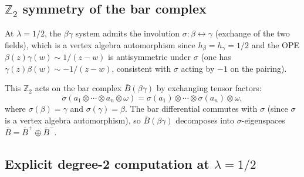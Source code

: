 \subsection{\texorpdfstring{$\mathbb{Z}_2$}{Z2} symmetry of the bar
complex}

\begin{definition}
\label{def:Z2-action-symplectic}
At $\lambda = 1/2$, the $\beta\gamma$ system admits the involution
$\sigma: \beta \leftrightarrow \gamma$ (exchange of the two fields),
which is a vertex algebra automorphism since
$h_\beta = h_\gamma = 1/2$ and the OPE
$\beta(z)\gamma(w) \sim 1/(z-w)$ is antisymmetric under
$\sigma$ (one has $\gamma(z)\beta(w) \sim -1/(z-w)$, consistent
with $\sigma$ acting by $-1$ on the pairing).
\end{definition}

This $\mathbb{Z}_2$ acts on the bar complex $\bar{B}(\beta\gamma)$
by exchanging tensor factors:
\begin{equation}\label{eq:Z2-on-bar}
\sigma(a_1 \otimes \cdots \otimes a_n \otimes \omega)
= \sigma(a_1) \otimes \cdots \otimes \sigma(a_n) \otimes \omega,
\end{equation}
where $\sigma(\beta) = \gamma$ and $\sigma(\gamma) = \beta$.
The bar differential commutes with $\sigma$ (since $\sigma$ is a
vertex algebra automorphism), so $\bar{B}(\beta\gamma)$
decomposes into $\sigma$-eigenspaces
$\bar{B} = \bar{B}^+ \oplus \bar{B}^-$.

\subsection{Explicit degree-2 computation at \texorpdfstring{$\lambda = 1/2$}{lambda = 1/2}}

